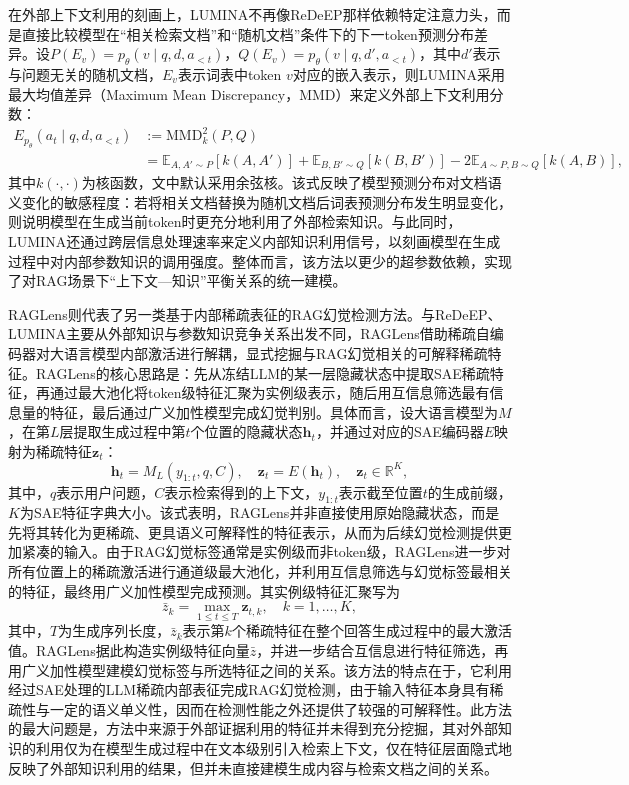 在外部上下文利用的刻画上，LUMINA不再像ReDeEP那样依赖特定注意力头，而是直接比较模型在“相关检索文档”和“随机文档”条件下的下一token预测分布差异。设$P(E_v)=p_\theta(v\mid q,d,a_{<t})$，$Q(E_v)=p_\theta(v\mid q,d',a_{<t})$，其中$d'$表示与问题无关的随机文档，$E_v$表示词表中token $v$对应的嵌入表示，则LUMINA采用最大均值差异（Maximum Mean Discrepancy，MMD）来定义外部上下文利用分数：
\begin{equation}
\begin{aligned}
    E_{p_\theta}(a_t \mid q,d,a_{<t})
    &:=
    \mathrm{MMD}_k^2(P,Q) \\
    &=
    \mathbb{E}_{A,A'\sim P}[k(A,A')]
    +
    \mathbb{E}_{B,B'\sim Q}[k(B,B')]
    -
    2\mathbb{E}_{A\sim P,B\sim Q}[k(A,B)],
\end{aligned}
\end{equation}
其中$k(\cdot,\cdot)$为核函数，文中默认采用余弦核。该式反映了模型预测分布对文档语义变化的敏感程度：若将相关文档替换为随机文档后词表预测分布发生明显变化，则说明模型在生成当前token时更充分地利用了外部检索知识。与此同时，LUMINA还通过跨层信息处理速率来定义内部知识利用信号，以刻画模型在生成过程中对内部参数知识的调用强度。整体而言，该方法以更少的超参数依赖，实现了对RAG场景下“上下文—知识”平衡关系的统一建模。

RAGLens\cite{xiong2025toward}则代表了另一类基于内部稀疏表征的RAG幻觉检测方法。与ReDeEP、LUMINA主要从外部知识与参数知识竞争关系出发不同，RAGLens借助稀疏自编码器对大语言模型内部激活进行解耦，显式挖掘与RAG幻觉相关的可解释稀疏特征。RAGLens的核心思路是：先从冻结LLM的某一层隐藏状态中提取SAE稀疏特征，再通过最大池化将token级特征汇聚为实例级表示，随后用互信息筛选最有信息量的特征，最后通过广义加性模型完成幻觉判别。具体而言，设大语言模型为$M$，在第$L$层提取生成过程中第$t$个位置的隐藏状态$\mathbf{h}_t$，并通过对应的SAE编码器$E$映射为稀疏特征$\mathbf{z}_t$：
\begin{equation}
\mathbf{h}_t=M_L(y_{1:t},q,C),\quad
\mathbf{z}_t=E(\mathbf{h}_t),\quad \mathbf{z}_t\in\mathbb{R}^K,
\end{equation}
其中，$q$表示用户问题，$C$表示检索得到的上下文，$y_{1:t}$表示截至位置$t$的生成前缀，$K$为SAE特征字典大小。该式表明，RAGLens并非直接使用原始隐藏状态，而是先将其转化为更稀疏、更具语义可解释性的特征表示，从而为后续幻觉检测提供更加紧凑的输入。由于RAG幻觉标签通常是实例级而非token级，RAGLens进一步对所有位置上的稀疏激活进行通道级最大池化，并利用互信息筛选与幻觉标签最相关的特征，最终用广义加性模型完成预测。其实例级特征汇聚写为
\begin{equation}
\bar{z}_k=\max_{1\le t\le T} \mathbf{z}_{t,k},\quad k=1,\dots,K,
\end{equation}
其中，$T$为生成序列长度，$\bar{z}_k$表示第$k$个稀疏特征在整个回答生成过程中的最大激活值。RAGLens据此构造实例级特征向量$\bar{z}$，并进一步结合互信息进行特征筛选，再用广义加性模型建模幻觉标签与所选特征之间的关系。该方法的特点在于，它利用经过SAE处理的LLM稀疏内部表征完成RAG幻觉检测，由于输入特征本身具有稀疏性与一定的语义单义性，因而在检测性能之外还提供了较强的可解释性。此方法的最大问题是，方法中来源于外部证据利用的特征并未得到充分挖掘，其对外部知识的利用仅为在模型生成过程中在文本级别引入检索上下文，仅在特征层面隐式地反映了外部知识利用的结果，但并未直接建模生成内容与检索文档之间的关系。


